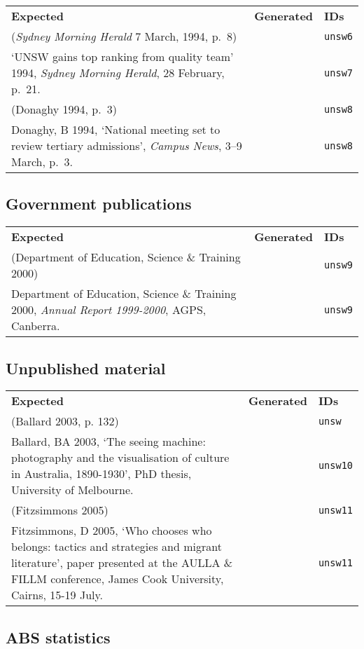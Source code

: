 \documentclass[a4paper,landscape,12pt]{article}
\newlength\q
\newlength\qr
\newenvironment{citetable}
  {\noindent\begin{longtable}{p{\q} p{\q} p{\qr}}\textbf{Expected} & \textbf{Generated} & \textbf{IDs}\\}
  {\end{longtable}}
\newcommand{\majorissue}[1]{\textcolor{red}{#1}}
\begin{document}
\begin{citetable}
	(\textit{Sydney Morning Herald} 7 March, 1994, p.~8) & \majorissue{\parencite{unsw6}} & \texttt{unsw6} \\
	`UNSW gains top ranking from quality team' 1994, \textit{Sydney Morning Herald}, 28 February, p.~21. & \fullcite{unsw7} & \texttt{unsw7} \\
	(Donaghy 1994, p.~3) & \parencite[p.~3]{unsw8} & \texttt{unsw8} \\
	Donaghy, B 1994, `National meeting set to review tertiary admissions', \textit{Campus News}, 3--9 March, p.~3. & \fullcite{unsw8} & \texttt{unsw8} \\
\end{citetable}

\subsection{Government publications}

\begin{citetable}
	(Department of Education, Science \& Training 2000) & \parencite{unsw9} & \texttt{unsw9} \\
	Department of Education, Science \& Training 2000, \textit{Annual Report 1999-2000}, AGPS, Canberra. & \fullcite{unsw9} & \texttt{unsw9} \\
\end{citetable}

\subsection{Unpublished material}

\begin{citetable}
	(Ballard 2003, p. 132) & \parencite[p.~132]{unsw10} & \texttt{unsw} \\
	Ballard, BA 2003, `The seeing machine: photography and the visualisation of culture in Australia, 1890-1930', PhD thesis, University of Melbourne. & \fullcite{unsw10} & \texttt{unsw10} \\
	(Fitzsimmons 2005) & \parencite{unsw11} & \texttt{unsw11} \\
	Fitzsimmons, D 2005, `Who chooses who belongs: tactics and strategies and migrant literature', paper presented at the AULLA \& FILLM conference, James Cook University, Cairns, 15-19 July. & \fullcite{unsw11} & \texttt{unsw11} \\
\end{citetable}

\subsection{ABS statistics}
\end{document}
